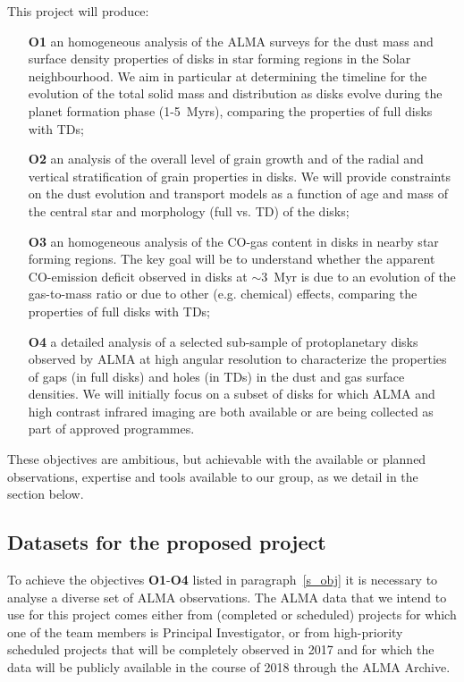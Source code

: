 \documentclass[10pt,fleqn,twoside]{article}
\newcommand{\Tcol}{\color{blue}}
\begin{document}
This project will produce:
\begin{itemize}
\item[{\bf O1}] an homogeneous analysis of the ALMA surveys for the dust mass and surface density properties of disks in star forming regions in the Solar neighbourhood. We aim in particular at determining the timeline for the evolution of the total solid mass and distribution as disks evolve during the planet formation phase (1-5~Myrs), comparing the properties of full disks with TDs;
\item[{\bf O2}] an analysis of the overall level of grain growth and of the radial and vertical stratification of grain properties in disks. We will provide constraints on the dust evolution and transport models as a function of age and mass of the central star and morphology (full vs. TD) of the disks;
\item[{\bf O3}] an homogeneous analysis of the CO-gas content in disks in nearby star forming regions. The key goal will be to understand whether the apparent CO-emission deficit observed in disks at $\sim$3~Myr is due to an evolution of the gas-to-mass ratio or due to other (e.g. chemical) effects, comparing the properties of full disks with TDs;
\item[{\bf O4}] a detailed analysis of a selected sub-sample of protoplanetary disks observed by ALMA at high angular resolution to characterize the properties of gaps (in full disks) and holes (in TDs) in the dust and gas surface densities. We will initially focus on a subset of disks for which ALMA and high contrast infrared imaging are both available or are being collected as part of approved programmes. 
\end{itemize}

These objectives are ambitious, but achievable with the available or planned observations, expertise and tools available to our group, as we detail in the section below.

\subsection{\Tcol Datasets for the proposed project}
\label{s_data}

To achieve the objectives {\bf O1}-{\bf O4} listed in paragraph~\ref{s_obj} it is necessary to analyse a diverse set of ALMA observations. The ALMA data that we intend to use for this project comes either from (completed or scheduled) projects for which one of the team members is Principal Investigator, or from high-priority scheduled projects that will be completely observed in 2017 and for which the data will be publicly available in the course of 2018 through the ALMA Archive.
\end{document}
